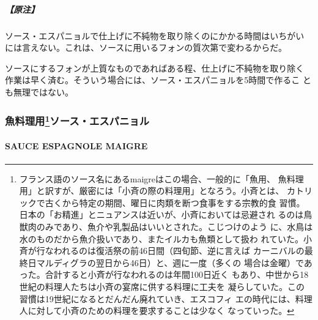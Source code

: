 \begin{recette}
\hypertarget{ux539fux6ce8}{%
\subparagraph{【原注】}\label{ux539fux6ce8}}

ソース・エスパニョルで仕上げに不純物を取り除くのにかかる時間はいちがい
には言えない。これは、ソースに用いるフォンの質次第で変わるからだ。

ソースにするフォンが上質なものであればある程、仕上げに不純物を取り除く
作業は早く済む。そういう場合には、ソース・エスパニョルを5時間で作るこ
とも無理ではない。

\maeaki

\hypertarget{ux9b5aux6599ux7406ux75280102006ux30bdux30fcux30b9ux30a8ux30b9ux30d1ux30cbux30e7ux30eb}{%
\subsubsection[魚料理用ソース・エスパニョル]{\texorpdfstring{魚料理用\footnote{フランス語のソース名にあるmaigreはこの場合、一般的に「魚用、
  魚料理用」と訳すが、厳密には「小斉の際の料理用」となろう。小斉とは、
  カトリックで古くから特定の期間、曜日に肉類を断つ食事をする宗教的食
  習慣。日本の「お精進」とニュアンスは近いが、小斉においては忌避され
  るのは鳥獣肉のみであり、魚介や乳製品はいいとされた。こじつけのよう
  に、水鳥は水のものだから魚介扱いであり、またイルカも魚類として扱わ
  れていた。小斉が行なわれるのは復活祭の前46日間（四旬節、逆に言えば
  カーニバルの最終日マルディグラの翌日から46日）と、週に一度（多くの
  場合は金曜）であった。合計すると小斉が行なわれるのは年間100日近く
  もあり、中世から18世紀の料理人たちは小斉の宴席に供する料理に工夫を
  凝らしていた。この習慣は19世紀になるとだんだん廃れていき、エスコフィ
  エの時代には、料理人に対して小斉のための料理を要求することは少なく
  なっていった。}ソース・エスパニョル}{魚料理用ソース・エスパニョル}}\label{ux9b5aux6599ux7406ux75280102006ux30bdux30fcux30b9ux30a8ux30b9ux30d1ux30cbux30e7ux30eb}}

\hypertarget{sauce-espagnole-maigre}{%
\paragraph{SAUCE ESPAGNOLE MAIGRE}\label{sauce-espagnole-maigre}}

   


\end{recette}
